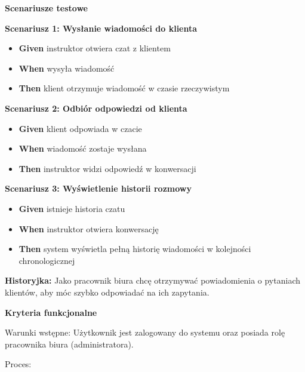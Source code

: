 \documentclass[a4paper,12pt]{article}
\begin{document}
\noindent \textbf{Scenariusze testowe}

\textbf{Scenariusz 1: Wysłanie wiadomości do klienta}
\begin{itemize}
    \item \textbf{Given} instruktor otwiera czat z klientem
    \item \textbf{When} wysyła wiadomość
    \item \textbf{Then} klient otrzymuje wiadomość w czasie rzeczywistym
\end{itemize}

\textbf{Scenariusz 2: Odbiór odpowiedzi od klienta}
\begin{itemize}
    \item \textbf{Given} klient odpowiada w czacie
    \item \textbf{When} wiadomość zostaje wysłana
    \item \textbf{Then} instruktor widzi odpowiedź w konwersacji
\end{itemize}

\textbf{Scenariusz 3: Wyświetlenie historii rozmowy}
\begin{itemize}
    \item \textbf{Given} istnieje historia czatu
    \item \textbf{When} instruktor otwiera konwersację
    \item \textbf{Then} system wyświetla pełną historię wiadomości w kolejności chronologicznej
\end{itemize}

\vspace{0,5cm}

\noindent \textbf{Historyjka:} Jako pracownik biura chcę otrzymywać powiadomienia o pytaniach klientów, aby móc szybko odpowiadać na ich zapytania.

\vspace{0,2cm}

\noindent \textbf{Kryteria funkcjonalne}

\vspace{0,2cm}

\noindent Warunki wstępne: Użytkownik jest zalogowany do systemu oraz posiada rolę pracownika biura (administratora).

\vspace{0,2cm}

\noindent Proces:
\end{document}
